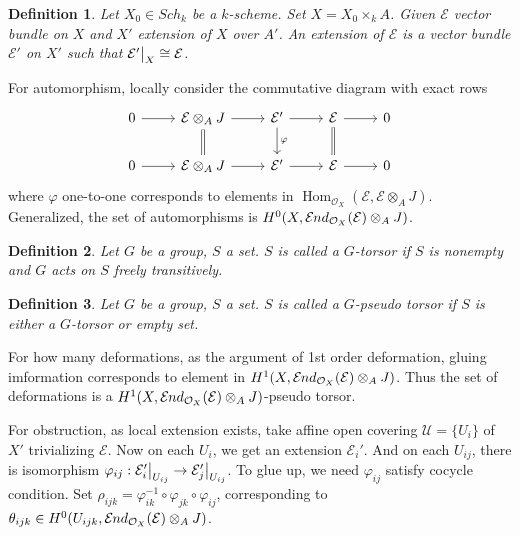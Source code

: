 \documentclass{ctexart}
\newtheorem{definition}{Definition}[section]
\renewcommand{\hom}{\operatorname{Hom}}
\newcommand{\sheafend}{\mathcal{E}\kern -.5pt nd}
\begin{document}
\begin{definition}
    Let $X_{0}\in Sch_{k}$ be a $k$-scheme.
    Set $X = X_{0} \times_{k} A$.
    Given $\mathcal{E}$ vector bundle on $X$ and $X'$ extension of $X$ over $A'$.
    An extension of $\mathcal{E}$ is a vector bundle $\mathcal{E}'$ on $X'$ such that $\mathcal{E}'\big{|}_{X} \cong \mathcal{E}$.
\end{definition}
For automorphism, locally consider the commutative diagram with exact rows
\begin{equation}
    \begin{tikzcd}
        0 \arrow[r] &
        \mathcal{E} \otimes_{A} J \arrow[r] \arrow[d, equal] &
        \mathcal{E}' \arrow[r] \arrow[d, "\varphi"] &
        \mathcal{E} \arrow[r] \arrow[d, equal] &
        0 \\
        0 \arrow[r] &
        \mathcal{E} \otimes_{A} J \arrow[r] &
        \mathcal{E}' \arrow[r] &
        \mathcal{E} \arrow[r] &
        0
    \end{tikzcd}
\end{equation}
where $\varphi$ one-to-one corresponds to elements in $\hom_{\mathcal{O}_{X}}(\mathcal{E}, \mathcal{E} \otimes_{A} J)$.
Generalized, the set of automorphisms is $H^{0}(X, \sheafend_{\mathcal{O}_{X}}(\mathcal{E}) \otimes_{A} J)$.
\begin{definition}
    Let $G$ be a group, $S$ a set.
    $S$ is called a $G$-torsor if $S$ is nonempty and $G$ acts on $S$ freely transitively.
\end{definition}
\begin{definition}
    Let $G$ be a group, $S$ a set.
    $S$ is called a $G$-pseudo torsor if $S$ is either a $G$-torsor or empty set.
\end{definition}
For how many deformations, as the argument of 1st order deformation, gluing imformation corresponds to element in $H^{1}(X, \sheafend_{\mathcal{O}_{X}}(\mathcal{E}) \otimes_{A} J)$.
Thus the set of deformations is a $H^{1}(X, \sheafend_{\mathcal{O}_{X}}(\mathcal{E}) \otimes_{A} J)$-pseudo torsor. 
\par
For obstruction, as local extension exists, take affine open covering $\mathcal{U} = \{U_{i}\}$ of $X'$ trivializing $\mathcal{E}$.
Now on each $U_{i}$, we get an extension $\mathcal{E}_{i}'$.
And on each $U_{ij}$, there is isomorphism $\varphi_{ij}: \mathcal{E}_{i}'\big{|}_{U_{ij}} \rightarrow \mathcal{E}_{j}'\big{|}_{U_{ij}}$.
To glue up, we need $\varphi_{ij}$ satisfy cocycle condition.
Set $\rho_{ijk} = \varphi_{ik}^{-1} \circ \varphi_{jk} \circ \varphi_{ij}$, corresponding to $\theta_{ijk}\in H^{0}(U_{ijk}, \sheafend_{\mathcal{O}_{X}}(\mathcal{E}) \otimes_{A} J)$.
\end{document}
